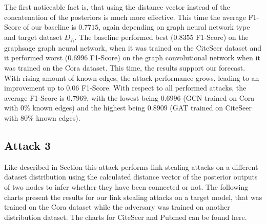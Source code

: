             The first noticeable fact is, that using the distance vector instead of the concatenation of the posteriors is much more effective.
            This time the average F1-Score of our baseline is $0.7715$, again depending on graph neural network type and target dataset $D_{f_t}$.
            The baseline performed best ($0.8355$ F1-Score) on the graphsage graph neural network, when it was trained on the  CiteSeer dataset and it performed worst ($0.6996$ F1-Score) on the graph convolutional network when it was trained on the Cora dataset.
            This time, the results support our forecast.
            With rising amount of known edges, the attack performance grows, leading to an improvement up to 0.06 F1-Score.
            With respect to all performed attacks, the average F1-Score is $0.7969$, with the lowest being $0.6996$ (GCN trained on Cora with 0\% known edges) and the highest being $0.8909$ (GAT trained on CiteSeer with 80\% known edges).

        \subsection*{Attack 3}
            Like described in Section  this attack performs link stealing attacks on a different dataset distribution using the calculated distance vector of the posterior outputs of two nodes to infer whether they have been connected or not. 
            The following charts present the results for our link stealing attacks on a target model, that was trained on the Cora dataset while the adversary was trained on another distribution dataset.
            The charts for CiteSeer and Pubmed can be found here. 


    

